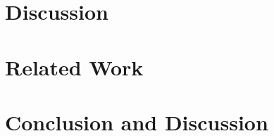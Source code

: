 \documentclass[10pt,preprint]{sigplanconf}
\begin{document}
\section{Discussion}\label{sec:discussion}


\section{Related Work}\label{sec:related}


\section{Conclusion and Discussion}\label{sec:conclusion}




% 
% 
% 

% 
\end{document}
